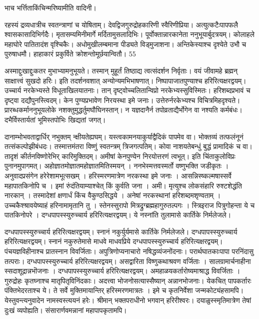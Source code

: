 भाच भर्त्तिताकिंचिन्मरिष्यामीति वादिनी।

रहस्यं द्रव्यधात्रीच स्वतन्त्राणां च योषिताम्।
देवद्विजगुरुद्रोहकारिणी स्वैरिणीप्रिया।
अत्युत्कटैःपापफलै श्वासकासादिभिर्गदैः।
मृतासम्यमिनीमार्गे मर्दितामुसलादिभिः।
पूर्वोक्तान्नारकानेता ननुभूयार्बुदत्रयम्।
कोलाहले महाघोरे पातितादंश वृश्चिकैः।
अधोमुखीलम्बमाना पीड्यते विड्मुजाशना।
अन्तिकेस्याश्च दृश्येते उभौ च पुरुषाधमौ।
हाहाकारं प्रकुर्विते क्रोशन्तोमूर्छयान्वितौ।
55

अस्माद्दुःखाद्दुःकतर मुभाभ्यामनुभूयते।
तस्मान् मुहूर्तं तिष्ठाद्य त्वत्संदर्शन निर्वृताः।
वयं जीवामहे ब्रह्मन् साक्षात्त्वं सुखदो हरिः।
इति तदर्शनवशात् अन्योन्यमभिभाषणात्।
निष्पापाजातपुण्याश्च हरिरित्यक्षरद्वयम्।
उच्चार्य नरकेभ्यस्ते विधूताखिलयातनाः।
तान् दृष्ट्वोच्चलितान्विप्रो नरकेभ्यस्सुविस्मितः।
हरिशब्दप्रभावं च दृष्ट्वा दद्यौपुनस्त्विदम्।
केन पुण्यप्रभावेण निरयस्था इमे जनाः।
उत्तेरुर्नरकेभ्यश्च विचित्रमिहदृश्यते।
प्रारब्धकर्माननुभूयलोके नशक्तुमुद्धर्तुमघौघिनस्तान्।
न यज्ञदानैर्न तपोव्रताद्यैर्भोगेन वा नश्यति कर्मबंधः।
दभैर्विस्तार्यतां भूमिस्तपोभिः खिद्यतां जगत्।

दानाम्भोभवताद्वार्धिर् नभुक्तम् न्क्षीयतेह्यघम्।
यस्त्वकामनयाकुर्याद्वैदिकं पापमेव वा।
भोक्तव्यं तत्फलंनूनं तत्संकल्पोझीबंधदः।
तस्मात्तमंतरा विष्णुं स्वतन्त्रम् त्रिजगत्पतिम्।
कोवा नाशयतेबन्धुं बुद्धं प्रामादिकं च वा।
तादृशं कीर्तनविष्णोरेभिर् कारिमुक्तिदम्।
अमीषां केनपुण्येन निरयोत्तरणं त्वभूत्।
इति चिंताकुलोविप्रः पुनानमुपागमत्।
अहोज्ञातमोज्ञातमहोज्ञातमितिस्मयन् ।
ननभेस्मत्तवस्मर्तो वष्णुभक्ति जडीकृतः ।
अनुवादप्रसंगेन हरेरेशामभूत्सखम् ।
हरिस्मरणमात्रेण नरकस्था इमे जनाः ।
आसन्निस्ष्कल्मषास्सर्वे महापातकिनोपि च ।
इमां रुंदंतियाम्याश्चेत् किं कुर्वति जना ।
अमी।
मृत्युश्च लोकसंहारि रुश्टशेद्धंति नारकान् ।
तस्मादेशां क्षणार्धं किंच वैकुण्ठसिद्धये ।
अनेषां नरकस्थानां हरिशब्दमशृण्वताम् ।
उच्चकैश्श्रावयेष्याहं हरिनामामृतानि तु ।
स्तेनस्सुरापो मित्रद्रुग्ब्रह्महागुरुतल्पगः ।
स्त्रिइराज पित्रुगोहन्ता ये च पातकिनोपरे ।
दग्धपापस्स्युरुच्चार्य हरिरित्यक्षरद्वयम्।
ये नस्नांति तुलामासे कार्तिके निर्मलेजले।

दग्धपापस्स्युरुच्चार्य हरिरित्यक्षरद्वयम्।
स्नानं नकुर्युर्यमासे कार्तिके निर्मलेजले।
दग्धपापस्स्युरुच्चार्य हरिरित्यक्षरद्वयम्।
स्नानं नकुरुतेमासे माधवे माधवप्रिये दग्धपापस्स्युरुच्चार्य हरिरित्यक्षरद्वयम्।
पंचयज्ञविहीनाश्च प्रातस्नान विवर्जिताः।
अपुत्रिणोप्यनाचारो नषिद्धव्यंजनोंदनाः।
परार्थघातकाःपापा परनिंदासु तत्पराः।
दग्धपापस्स्युरुच्चार्य हरिरित्यक्षरद्वयम्।
असद्वारिता विष्णुकथाश्रवण वर्जिताः ।
सालग्रामार्चनाहीना स्सदाशूद्रान्नभॊजनाः ।
दग्धपापस्स्युरुच्चार्य हरिरित्यक्षरद्वयम्।
अमहाळयकर्तारोष्यमाश्राद्ध विवर्जिताः ।
गुरुद्रोहः कृतघ्नाश्च मातृपितृविनिंदकाः।
अदत्त्वा भोजनोसत्यास्सैष्यान् अन्नानभोजनाः।
येकचित् पापकर्तारः पंक्तिभेदरताश्च ये।
ते सर्वे मुक्तिमायान्तिर् हरिस्मरणमात्रतः ।
इमे च कृतनिर्वेशा जन्मकोट्यंहसामपि।
येस्तुवन्त्यनुवादेन नामस्वस्त्ययनं हरेः।
श्रीमान् भक्तपराधीनो भगवान् हरिरीश्वरः।
दयाळुस्स्मृतिमात्रेण तेषां दुःखं व्यपोह्यति।
संसारार्णवमन्नानां महापापकृतामपि।

